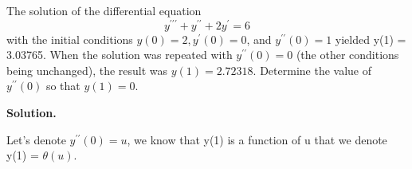 \begin{exercise}{2} %
The solution of the differential equation
$$y^{\prime\prime\prime} + y^{\prime\prime} + 2y^{\prime} = 6$$
with the initial conditions $y(0) = 2, y^\prime(0) = 0$, and $y^{\prime\prime}(0) = 1$ yielded y(1) = 3.03765. When the solution was repeated with $y^{\prime\prime}(0) = 0$ (the other conditions
being unchanged), the result was $y(1) = 2.72318$. Determine the value of $y^{\prime\prime}(0)$ so that $y(1) = 0$.

\textbf{Solution.}

Let's denote $y^{\prime\prime}(0) = u$, we know that y(1) is a function of u that we denote y(1) = $\theta(u)$.



\end{exercise}


